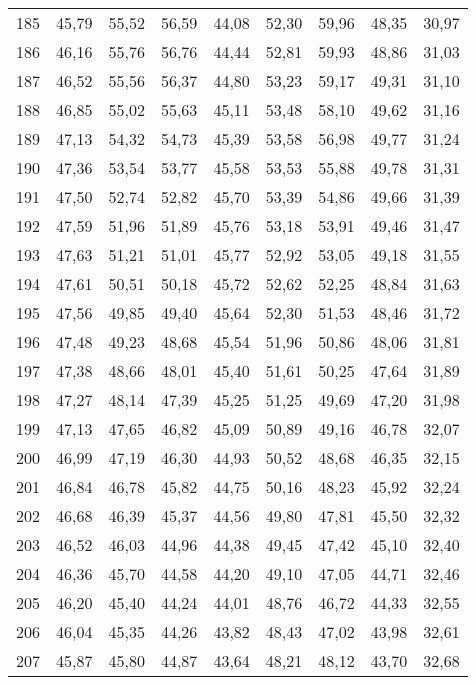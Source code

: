 \begin{longtable}{c c c c c c c c c}
      185& 	45,79& 	55,52& 	56,59& 	44,08& 	52,30& 	59,96& 	48,35& 	30,97 \\
      186& 	46,16& 	55,76& 	56,76& 	44,44& 	52,81& 	59,93& 	48,86& 	31,03 \\
      187& 	46,52& 	55,56& 	56,37& 	44,80& 	53,23& 	59,17& 	49,31& 	31,10 \\
      188& 	46,85& 	55,02& 	55,63& 	45,11& 	53,48& 	58,10& 	49,62& 	31,16 \\
      189& 	47,13& 	54,32& 	54,73& 	45,39& 	53,58& 	56,98& 	49,77& 	31,24 \\
      190& 	47,36& 	53,54& 	53,77& 	45,58& 	53,53& 	55,88& 	49,78& 	31,31 \\
      191& 	47,50& 	52,74& 	52,82& 	45,70& 	53,39& 	54,86& 	49,66& 	31,39 \\
      192& 	47,59& 	51,96& 	51,89& 	45,76& 	53,18& 	53,91& 	49,46& 	31,47 \\
      193& 	47,63& 	51,21& 	51,01& 	45,77& 	52,92& 	53,05& 	49,18& 	31,55 \\
      194& 	47,61& 	50,51& 	50,18& 	45,72& 	52,62& 	52,25& 	48,84& 	31,63 \\
      195& 	47,56& 	49,85& 	49,40& 	45,64& 	52,30& 	51,53& 	48,46& 	31,72 \\
      196& 	47,48& 	49,23& 	48,68& 	45,54& 	51,96& 	50,86& 	48,06& 	31,81 \\
      197& 	47,38& 	48,66& 	48,01& 	45,40& 	51,61& 	50,25& 	47,64& 	31,89 \\
      198& 	47,27& 	48,14& 	47,39& 	45,25& 	51,25& 	49,69& 	47,20& 	31,98 \\
      199& 	47,13& 	47,65& 	46,82& 	45,09& 	50,89& 	49,16& 	46,78& 	32,07 \\
      200& 	46,99& 	47,19& 	46,30& 	44,93& 	50,52& 	48,68& 	46,35& 	32,15 \\
      201& 	46,84& 	46,78& 	45,82& 	44,75& 	50,16& 	48,23& 	45,92& 	32,24 \\
      202& 	46,68& 	46,39& 	45,37& 	44,56& 	49,80& 	47,81& 	45,50& 	32,32 \\
      203& 	46,52& 	46,03& 	44,96& 	44,38& 	49,45& 	47,42& 	45,10& 	32,40 \\
      204& 	46,36& 	45,70& 	44,58& 	44,20& 	49,10& 	47,05& 	44,71& 	32,46 \\
      205& 	46,20& 	45,40& 	44,24& 	44,01& 	48,76& 	46,72& 	44,33& 	32,55 \\
      206& 	46,04& 	45,35& 	44,26& 	43,82& 	48,43& 	47,02& 	43,98& 	32,61 \\
      207& 	45,87& 	45,80& 	44,87& 	43,64& 	48,21& 	48,12& 	43,70& 	32,68 \\

\end{longtable}

